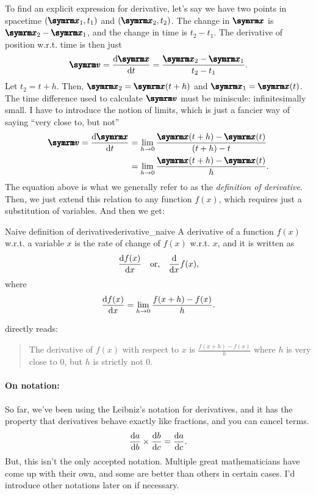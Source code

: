 To find an explicit expression for derivative, let's say we have two points in spacetime $(\vv{x}_1, t_1)$ and $(\vv{x}_2, t_2)$. The change in $\vv{x}$ is $\vv{x}_2 - \vv{x}_1$, and the change in time is $t_2 - t_1$. The derivative of position w.r.t. time is then just
\begin{equation}
    \vv{v} = \odv{\vv{x}}{t} = \frac{\vv{x}_2 - \vv{x}_1}{t_2 - t_1}. \label{eq:derivative1}
\end{equation}
Let $t_2 = t + h$. Then, $\vv{x}_2 = \vv{x}(t + h)$ and $\vv{x}_1 = \vv{x}(t)$. The time difference used to calculate $\vv{v}$ must be miniscule: infinitesimally small. I have to introduce the notion of limits, which is just a fancier way of saying ``very close to, but not''
\begin{align}
    \vv{v} = \odv{\vv{x}}{t} &= \lim_{h \appr 0}\frac{\vv{x}(t + h) - \vv{x}(t)}{(t + h) - t} \\
							 &= \lim_{h \appr 0}\frac{\vv{x}(t + h) - \vv{x}(t)}{h}.
\end{align}
The equation above is what we generally refer to as the \emph{definition of derivative}. Then, we just extend this relation to any function $f(x)$, which requires just a substitution of variables. And then we get:
\begin{df}{Naive definition of derivative}{derivative_naive}
    A derivative of a function $f(x)$ w.r.t. a variable $x$ is the rate of change of $f(x)$ w.r.t. $x$, and it is written as
    \begin{equation}
        \odv{f(x)}{x} \mathor \odv*{f(x)}{x},
    \end{equation}
    where
    \begin{equation}
        \odv{f(x)}{x} = \lim_{h \appr 0}\frac{f(x + h) - f(x)}{h}.\label{eq:naive_definition_of_derivative}
    \end{equation}
\end{df}
 directly reads:
\begin{quote}
    The derivative of $f(x)$ with respect to $x$ is $\frac{f(x + h) - f(x)}{h}$ where $h$ is very close to $0$, but $h$ is strictly not $0$.
\end{quote}

\paragraph{On notation:} So far, we've been using the Leibniz's notation for derivatives, and it has the property that derivatives behave exactly like fractions, and you can cancel terms.
\begin{equation}
    \odv{a}{b}\times\odv{b}{c} = \odv{a}{c}.\label{eq:prechainrule}
\end{equation}
But, this isn't the only accepted notation. Multiple great mathematicians have come up with their own, and some are better than others in certain cases. I'd introduce other notations later on if necessary.

